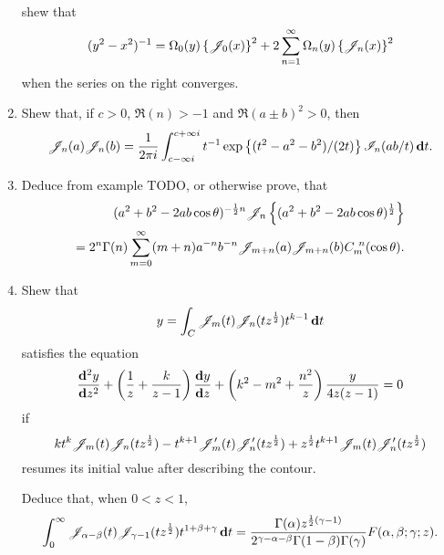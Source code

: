 \documentclass{book}
\begin{document}
\begin{enumerate}
$$  $$
  shew that
  $$
  (y^{2}-x^{2})^{-1}
  =
  \Omega_{0}(y)
  \left\{ \mathscr{J}_{0}(x) \right\}^{2}
  +
  2 \sum_{n=1}^{\infty} \Omega_{n}(y) \left\{ \mathscr{J}_{n}(x) \right\}^{2}
  $$
  when the series on the right converges.
\item
  Shew that, if $c>0$, $\Re(n) > -1$ and
  $\Re(a \pm b)^{2} > 0$, then
  $$
  \mathscr{J}_{n}(a) \mathscr{J}_{n}(b)
  =
  \frac{1}{2\pi i}
  \int_{c-\infty i}^{c+\infty i}
  t^{-1} \exp \left\{  (t^{2}-a^{2}-b^{2})/(2t) \right\}
  \mathscr{I}_{n}(ab/t) \, \mathbf{d} t.
  $$
\item
  Deduce from example TODO, or otherwise prove, that
  \begin{align*}
    (a^{2}+b^{2}-2ab \cos\theta)^{-\frac{1}{2} n}
    \mathscr{J}_{n}\left\{  (a^{2}+b^{2}-2ab\cos\theta)^{\frac{1}{2}} \right\}
    \\
    =
    2^{n} \Gamma(n)
    \sum_{m=0}^{\infty}
    (m+n) a^{-n} b^{-n} \mathscr{J}_{m+n}(a) \mathscr{J}_{m+n}(b)
    C_{m}^{\ n}(\cos\theta).
  \end{align*}
\item
  Shew that
  $$
  y = \int_{C} \mathscr{J}_{m}(t) \mathscr{J}_{n}(t z^{\frac{1}{2}}) t^{k-1} \, \mathbf{d} t
  $$
  satisfies the equation
  $$
  \frac{\mathbf{d}^{2} y}{\mathbf{d} z^{2}}
  +
  \left( \frac{1}{z} + \frac{k}{z-1} \right) \frac{\mathbf{d} y}{\mathbf{d} z}
  +
  \left( k^{2}-m^{2}+\frac{n^{2}}{z} \right) \frac{y}{4z(z-1)}
  =
  0
  $$
  if
  $$
  k t^{k} \mathscr{J}_{m}(t) \mathscr{J}_{n}(t z^{\frac{1}{2}})
  -
  t^{k+1} \mathscr{J}'_{m}(t) \mathscr{J}'_{n}(t z^{\frac{1}{2}})
  +
  z^{\frac{1}{2}} t^{k+1} \mathscr{J}_{m}(t) \mathscr{J}'_{n}(t z^{\frac{1}{2}})
  $$
  resumes its initial value after describing the contour.

  Deduce that, when $0<z<1$,
  $$
  \int_{0}^{\infty}
  \mathscr{J}_{\alpha-\beta}(t)
  \mathscr{J}_{\gamma-1}(t z^{\frac{1}{2}})
  t^{1+\beta+\gamma}
  \, \mathbf{d} t
  =
  \frac{\Gamma(\alpha) z^{\frac{1}{2}(\gamma-1)}}{ 2^{\gamma-\alpha-\beta}
    \Gamma(1-\beta) \Gamma(\gamma)}
  F(\alpha,\beta;\gamma;z).
  $$
\end{enumerate}
\end{document}
